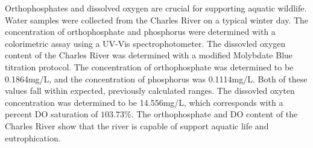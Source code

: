 


Orthophosphates and dissolved oxygen are crucial for supporting aquatic wildlife.  Water samples were collected from the Charles River on a typical winter day. The concentration of orthophosphate and phosphorus were determined with a colorimetric assay using a UV-Vis spectrophotometer. The dissovled oxygen content of the Charles River was determined with a modified Molybdate Blue titration protocol. The concentration of orthophosphate was determined to be 0.1864mg/L, and the concentration of phosphorus was 0.1114mg/L. Both of these values fall within expected, previously calculated ranges. The dissovled oxyten concentration was determined to be 14.556mg/L, which corresponds with a percent DO saturation of $103.73\%$. The orthophosphate and DO content of the Charles River show that the river is capable of support aquatic life and eutrophication.













